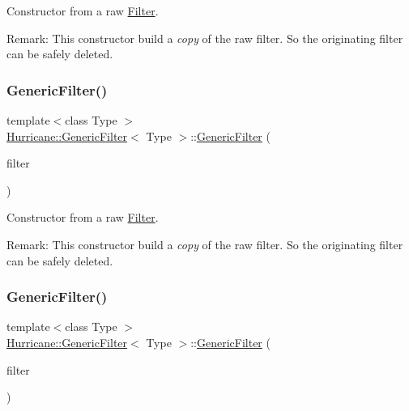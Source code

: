 Constructor from a raw \mbox{\hyperlink{classHurricane_1_1Filter}{Filter}}.

\begin{DoxyParagraph}{Remark\+: This constructor build a {\itshape copy} of the raw filter. So the originating}
filter can be safely deleted. 
\end{DoxyParagraph}
\mbox{\label{classHurricane_1_1GenericFilter_adf44866e7507f45dd0d612743f2d9a71}} 
\subsubsection{\texorpdfstring{Generic\+Filter()}{GenericFilter()}\hspace{0.1cm}{\footnotesize\ttfamily [2/3]}}
{\footnotesize\ttfamily template$<$class Type $>$ \\
\mbox{\hyperlink{classHurricane_1_1GenericFilter}{Hurricane\+::\+Generic\+Filter}}$<$ Type $>$\+::\mbox{\hyperlink{classHurricane_1_1GenericFilter}{Generic\+Filter}} (\begin{DoxyParamCaption}\item[{const \mbox{\hyperlink{classHurricane_1_1GenericFilter}{Generic\+Filter}}$<$ Type $>$ \&}]{filter }\end{DoxyParamCaption})\hspace{0.3cm}{\ttfamily [inline]}}

Constructor from a raw \mbox{\hyperlink{classHurricane_1_1Filter}{Filter}}.

\begin{DoxyParagraph}{Remark\+: This constructor build a {\itshape copy} of the raw filter. So the originating}
filter can be safely deleted. 
\end{DoxyParagraph}
\mbox{\label{classHurricane_1_1GenericFilter_aac847f0c0d6ee640c54847e374287fe1}} 
\subsubsection{\texorpdfstring{Generic\+Filter()}{GenericFilter()}\hspace{0.1cm}{\footnotesize\ttfamily [3/3]}}
{\footnotesize\ttfamily template$<$class Type $>$ \\
\mbox{\hyperlink{classHurricane_1_1GenericFilter}{Hurricane\+::\+Generic\+Filter}}$<$ Type $>$\+::\mbox{\hyperlink{classHurricane_1_1GenericFilter}{Generic\+Filter}} (\begin{DoxyParamCaption}\item[{\mbox{\hyperlink{classHurricane_1_1Filter}{Filter}}$<$ Type $>$ $\ast$}]{filter }\end{DoxyParamCaption})\hspace{0.3cm}{\ttfamily [inline]}}

